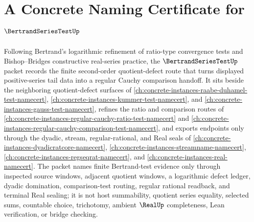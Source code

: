 \chapter{A Concrete Naming Certificate for $\BertrandSeriesTestUp$}
\label{ch:concrete-instances-bertrand-series-test-namecert}

Following Bertrand's logarithmic refinement of ratio-type convergence tests and Bishop--Bridges constructive real-series practice, the $\BertrandSeriesTestUp$ packet records the finite second-order quotient-defect route that turns displayed positive-series tail data into a regular Cauchy comparison handoff. It sits beside the neighboring quotient-defect surfaces of \autoref{ch:concrete-instances-raabe-duhamel-test-namecert}, \autoref{ch:concrete-instances-kummer-test-namecert}, and \autoref{ch:concrete-instances-gauss-test-namecert}, refines the ratio and comparison routes of \autoref{ch:concrete-instances-regular-cauchy-ratio-test-namecert} and \autoref{ch:concrete-instances-regular-cauchy-comparison-test-namecert}, and exports endpoints only through the dyadic, stream, regular-rational, and Real seals of \autoref{ch:concrete-instances-dyadicratcore-namecert}, \autoref{ch:concrete-instances-streamname-namecert}, \autoref{ch:concrete-instances-regseqrat-namecert}, and \autoref{ch:concrete-instances-real-namecert}. The packet names finite Bertrand-test evidence only through inspected source windows, adjacent quotient windows, a logarithmic defect ledger, dyadic domination, comparison-test routing, regular rational readback, and terminal Real sealing; it is not host summability, quotient series equality, selected sums, countable choice, trichotomy, ambient $\RealUp$ completeness, Lean verification, or bridge checking.

